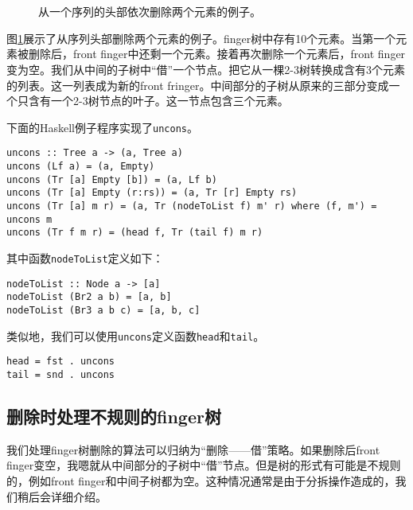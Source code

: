 \documentclass[UTF8]{article}
\begin{document}
\begin{figure}[htbp]
  \centering
   \\
   \\
  \caption{从一个序列的头部依次删除两个元素的例子。} \label{fig:ftr-uncons-example}
\end{figure}

图\ref{fig:ftr-uncons-example}展示了从序列头部删除两个元素的例子。finger树中存有10个元素。当第一个元素被删除后，front finger中还剩一个元素。接着再次删除一个元素后，front finger变为空。我们从中间的子树中“借”一个节点。把它从一棵2-3树转换成含有3个元素的列表。这一列表成为新的front fringer。中间部分的子树从原来的三部分变成一个只含有一个2-3树节点的叶子。这一节点包含三个元素。

下面的Haskell例子程序实现了\texttt{uncons}。

\lstset{language=Haskell}
\begin{lstlisting}
uncons :: Tree a -> (a, Tree a)
uncons (Lf a) = (a, Empty)
uncons (Tr [a] Empty [b]) = (a, Lf b)
uncons (Tr [a] Empty (r:rs)) = (a, Tr [r] Empty rs)
uncons (Tr [a] m r) = (a, Tr (nodeToList f) m' r) where (f, m') = uncons m
uncons (Tr f m r) = (head f, Tr (tail f) m r)
\end{lstlisting}

其中函数\texttt{nodeToList}定义如下：

\begin{lstlisting}
nodeToList :: Node a -> [a]
nodeToList (Br2 a b) = [a, b]
nodeToList (Br3 a b c) = [a, b, c]
\end{lstlisting}

类似地，我们可以使用\texttt{uncons}定义函数\texttt{head}和\texttt{tail}。

\begin{lstlisting}
head = fst . uncons
tail = snd . uncons
\end{lstlisting}

\subsection{删除时处理不规则的finger树}
我们处理finger树删除的算法可以归纳为“删除——借”策略。如果删除后front finger变空，我嗯就从中间部分的子树中“借”节点。但是树的形式有可能是不规则的，例如front finger和中间子树都为空。这种情况通常是由于分拆操作造成的，我们稍后会详细介绍。
\end{document}
